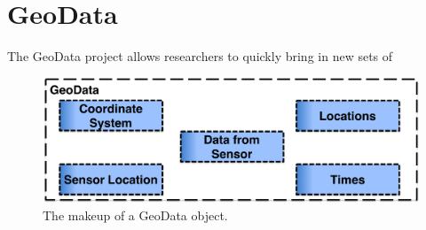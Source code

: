 
\section{GeoData}

The GeoData project allows researchers to quickly bring in new sets of 

\begin{figure}[!h]
\centering
\includegraphics[width=6.0in]{geodatadiagram}
\caption{The makeup of a GeoData object.}
\label{fig:swflow}
\end{figure}